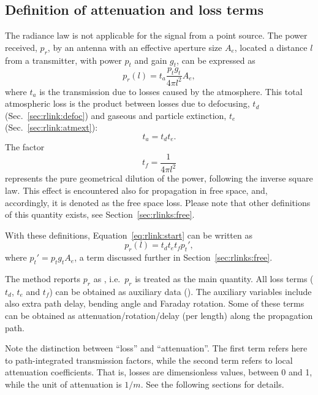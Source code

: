    
\subsection{Definition of attenuation and loss terms}
\label{sec:rlinks:oview}

The radiance law is not applicable for the signal from a point source.
The power received, $p_r$, by an antenna with an effective aperture size
$A_e$, located a distance $l$ from a transmitter, with power
$p_t$ and gain $g_t$, can be expressed as \citep[e.g.][]{ippolito:satco:08}
\begin{equation}
  \label{eq:rlink:start}
  p_r(l) = t_a\frac{p_tg_t}{4\pi l^2}A_e,
\end{equation}
where $t_a$ is the transmission due to losses caused by the atmosphere. This
total atmospheric loss is the product between losses due to defocusing,
$t_d$ (Sec.~\ref{sec:rlink:defoc}) and gaseous and particle extinction, $t_e$
(Sec.~\ref{sec:rlink:atmext}):
\begin{equation}
  t_a = t_d t_e.
\end{equation}
The factor
\begin{equation}
  \label{eq:rlink:fspl}
  t_f = \frac{1}{4\pi l^2}
\end{equation}
represents the pure geometrical dilution of the power, following the inverse
square law. This effect is encountered also for propagation in free space, and,
accordingly, it is denoted as the free space loss. Please note that
other definitions of this quantity exists, see Section~\ref{sec:rlinks:free}.

With these definitions, Equation~\ref{eq:rlink:start} can be written as
\begin{equation}
  \label{eq:rlink:pr}
  p_r(l) = t_d t_e t_f p_t',
\end{equation}
where $p_t'=p_tg_tA_e$, a term discussed further in
Section~\ref{sec:rlinks:free}.

The method  reports $p_r$ as , i.e.\ $p_r$
is treated as the main quantity. All loss terms ($t_d$, $t_e$ and $t_f$) can
be obtained as auxiliary data (). The auxiliary variables
include also extra path delay, bending angle and Faraday rotation. Some of
these terms can be obtained as attenuation/rotation/delay (per length) along the
propagation path.

Note the distinction between ``loss'' and ``attenuation''. The first term
refers here to path-integrated transmission factors, while the second term
refers to local attenuation coefficients. That is, losses are dimensionless
values, between 0 and 1, while the unit of attenuation is $1/m$. See the
following sections for details.

